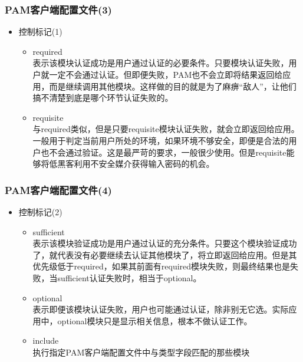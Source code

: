 \documentclass[xcolor=svgnames,presentation]{beamer}
\begin{document}
\begin{frame}
\frametitle{PAM客户端配置文件(3)}
\label{sec-6-7}
\begin{itemize}

\item 控制标记(1)
\label{sec-6-7-1}%
\begin{itemize}

\item required\\
\label{sec-6-7-1-1}%
表示该模块认证成功是用户通过认证的必要条件。只要模块认证失败，用户就一定不会通过认证。但即便失败，PAM也不会立即将结果返回给应用，而是继续调用其他模块。这样做的目的就是为了麻痹“敌人”，让他们搞不清楚到底是哪个环节认证失败的。

\item requisite\\
\label{sec-6-7-1-2}%
与required类似，但是只要requisite模块认证失败，就会立即返回给应用。一般用于判定当前用户所处的环境，如果环境不够安全，即便是合法的用户也不会通过验证。这是最严苛的要求，一般很少使用。但是requisite能够将低黑客利用不安全媒介获得输入密码的机会。
\end{itemize} %
\end{itemize} %
\end{frame}
\begin{frame}
\frametitle{PAM客户端配置文件(4)}
\label{sec-6-8}
\begin{itemize}

\item 控制标记(2)
\label{sec-6-8-1}%
\begin{itemize}

\item sufficient\\
\label{sec-6-8-1-1}%
表示该模块验证成功是用户通过认证的充分条件。只要这个模块验证成功了，就代表没有必要继续去认证其他模块了，将立即返回给应用。但是其优先级低于required，如果其前面有required模块失败，则最终结果也是失败，当sufficient认证失败时，相当于optional。

\item optional\\
\label{sec-6-8-1-2}%
表示即便该模块认证失败，用户也可能通过认证，除非别无它选。实际应用中，optional模块只是显示相关信息，根本不做认证工作。

\item include\\
\label{sec-6-8-1-3}%
执行指定PAM客户端配置文件中与类型字段匹配的那些模块
\end{itemize} %
\end{itemize} %
\end{frame}
\end{document}

